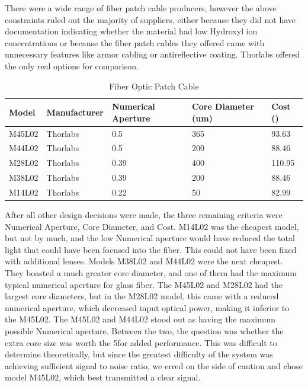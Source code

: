 There were a wide range of fiber patch cable producers, however the above constraints ruled out the majority of suppliers, either because they did not have documentation indicating whether the material had low Hydroxyl ion concentrations or because the fiber patch cables they offered came with unnecessary features like armor cabling or antireflective coating. Thorlabs offered the only real options for comparison.
\begin{table}[H]
	\centering
	\label{table:Fiber Optic Patch Cable}
	\caption{Fiber Optic Patch Cable}
	\bigskip
	\begin{tabular}{|p{2cm}|p{2.5cm}|p{2cm}|p{2.75cm}|p{1.75cm}|}
	\hline
	Model & Manufacturer & Numerical Aperture & Core Diameter (um) & Cost (\textdollar)\\
	\hline
	M45L02 & Thorlabs & 0.5 & 365 & 93.63\\
	\hline
	M44L02 & Thorlabs & 0.5 & 200 & 88.46\\
	\hline
	M28L02 & Thorlabs & 0.39 & 400 & 110.95\\
	\hline
	M38L02 & Thorlabs & 0.39 & 200 & 88.46\\
	\hline
	M14L02 & Thorlabs & 0.22 & 50 & 82.99\\
	\hline
	\end{tabular}
\end{table}
After all other design decisions were made, the three remaining criteria were Numerical Aperture, Core Diameter, and Cost. M14L02 was the cheapest model, but not by much, and the low Numerical aperture would have reduced the total light that could have been focused into the fiber. This could not have been fixed with additional lenses. Models M38L02 and M44L02 were the next cheapest. They boasted a much greater core diameter, and one of them had the maximum typical numerical aperture for glass fiber. The M45L02 and M28L02 had the largest core diameters, but in the M28L02 model, this came with a reduced numerical aperture, which decreased input optical power, making it inferior to the M45L02. The M45L02 and M44L02 stood out as having the maximum possible Numerical aperture. Between the two, the question was whether the extra core size was worth the 5\textdollar for added performance. This was difficult to determine theoretically, but since the greatest difficulty of the system was achieving sufficient signal to noise ratio, we erred on the side of caution and chose model M45L02, which best transmitted a clear signal.
